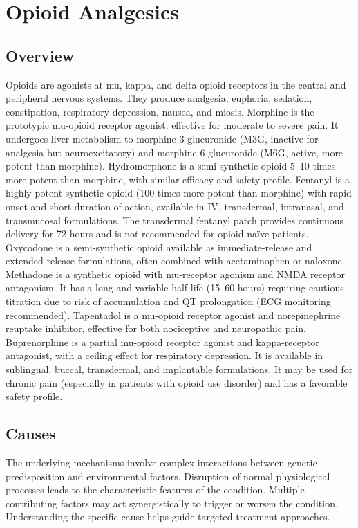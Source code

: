 \chapter{Opioid Analgesics}
\label{sec:Opioid Analgesics}

\section{Overview}
Opioids are agonists at mu, kappa, and delta opioid receptors in the central and peripheral nervous systems. They produce analgesia, euphoria, sedation, constipation, respiratory depression, nausea, and miosis. Morphine is the prototypic mu-opioid receptor agonist, effective for moderate to severe pain. It undergoes liver metabolism to morphine-3-glucuronide (M3G, inactive for analgesia but neuroexcitatory) and morphine-6-glucuronide (M6G, active, more potent than morphine). Hydromorphone is a semi-synthetic opioid 5--10 times more potent than morphine, with similar efficacy and safety profile. Fentanyl is a highly potent synthetic opioid (100 times more potent than morphine) with rapid onset and short duration of action, available in IV, transdermal, intranasal, and transmucosal formulations. The transdermal fentanyl patch provides continuous delivery for 72 hours and is not recommended for opioid-na{\"i}ve patients. Oxycodone is a semi-synthetic opioid available as immediate-release and extended-release formulations, often combined with acetaminophen or naloxone. Methadone is a synthetic opioid with mu-receptor agonism and NMDA receptor antagonism. It has a long and variable half-life (15--60 hours) requiring cautious titration due to risk of accumulation and QT prolongation (ECG monitoring recommended). Tapentadol is a mu-opioid receptor agonist and norepinephrine reuptake inhibitor, effective for both nociceptive and neuropathic pain. Buprenorphine is a partial mu-opioid receptor agonist and kappa-receptor antagonist, with a ceiling effect for respiratory depression. It is available in sublingual, buccal, transdermal, and implantable formulations. It may be used for chronic pain (especially in patients with opioid use disorder) and has a favorable safety profile.
\section{Causes}
The underlying mechanisms involve complex interactions between genetic predisposition and environmental factors. Disruption of normal physiological processes leads to the characteristic features of the condition. Multiple contributing factors may act synergistically to trigger or worsen the condition. Understanding the specific cause helps guide targeted treatment approaches.

